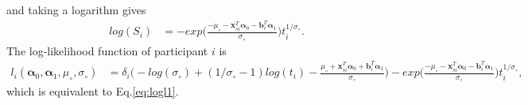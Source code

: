 and taking a logarithm gives
\begin{equation}
    \begin{split}
        log(S_i) &= -exp \Big(\frac{-\mu_{\circ} - \boldsymbol{x}_{si}^T \boldsymbol{\alpha}_0 - \boldsymbol{b}_i^T  \boldsymbol{\alpha}_1}{\sigma_{\circ}} \Big)  t_i^{1/\sigma_{\circ}}.
    \end{split}
\end{equation}
The log-likelihood function of participant $i$ is
\begin{equation}
    \begin{split}
        l_i(\boldsymbol{\alpha}_0, \boldsymbol{\alpha}_1, \mu_{\circ}, \sigma_{\circ}) &= \delta_i \Big(-log(\sigma_{\circ}) + (1/\sigma_{\circ}-1)log(t_i)- \frac{\mu_{\circ}+\boldsymbol{x}_{si}^T \boldsymbol{\alpha}_0 + \boldsymbol{b}_i^T \boldsymbol{\alpha}_1}{\sigma_{\circ}} \Big) - exp \Big(\frac{-\mu_{\circ} - \boldsymbol{x}_{si}^T \boldsymbol{\alpha}_0 - \boldsymbol{b}_i^T  \boldsymbol{\alpha}_1}{\sigma_{\circ}} \Big)  t_i^{1/\sigma_{\circ}},
    \end{split}
    \label{eq:logl2}
\end{equation}
which is equivalent to Eq.\ref{eq:logl1}.



